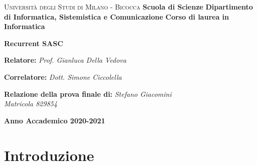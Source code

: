\documentclass{report}
\begin{document}
\begin{titlepage}


  \noindent
  \begin{minipage}[t]{0.19\textwidth}
  \end{minipage}
  \begin{minipage}[t]{0.81\textwidth}
    {
      {\textsc{Università degli Studi di Milano - Bicocca}}
      \textbf{Scuola di Scienze}
      \textbf{Dipartimento di Informatica, Sistemistica e Comunicazione}
      \textbf{Corso di laurea in Informatica}
      \par
    }
  \end{minipage}

  \vspace{40mm}

  \begin{center}
    {\LARGE{
        \textbf{Recurrent SASC}}}
  \end{center}

  \vspace{50mm}

  \noindent
  {\large \textbf{Relatore:} \textit{Prof. Gianluca Della Vedova} }

  \noindent
  {\large \textbf{Correlatore:} \textit{Dott. Simone Ciccolella}}

  \vspace{15mm}

  \begin{flushright}
    \textbf{\large Relazione della prova finale di:}
    \large{\textit{Stefano Giacomini}}\\
    \large{\textit{Matricola 829854}}
  \end{flushright}

  \vspace{40mm}
  \begin{center}
    {\large{\bf Anno Accademico 2020-2021}}
  \end{center}

  \restoregeometry

\end{titlepage}
\restoregeometry

{\pagestyle{plain}
  \tableofcontents
  \cleardoublepage}

\chapter{Introduzione}
\end{document}
